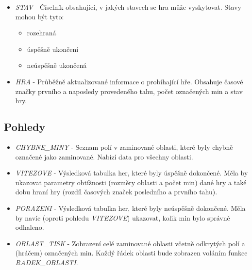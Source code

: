 \documentclass{article}
\begin{document}
{\begin{itemize}
    \item \textit{STAV} - Číselník obsahující, v jakých stavech se hra 
        může vyskytovat. Stavy mohou být tyto: 
        \begin{itemize}
            \item rozehraná
            \item úspěšně ukončení
            \item neúspěšně ukončená
        \end{itemize}
    
    \item \textit{HRA} - Průběžně aktualizované informace o probíhající hře. Obsahuje časové značky
    prvního a naposledy provedeného tahu, počet označených min a stav hry.
\end{itemize}
}
\subsection{Pohledy}
{\renewcommand\labelitemi{}
\begin{itemize}
    \item \textit{CHYBNE\_MINY} - Seznam polí v zaminované oblasti, které byly     chybně označené jako
        zaminované. Nabízí data pro všechny oblasti.
    
    \item \textit{VITEZOVE} - Výsledková tabulka her, které byly úspěšně 
        dokončené. Měla by ukazovat parametry obtížnosti (rozměry oblasti 
        a počet min) dané hry a také dobu hraní hry (rozdíl časových značek 
        posledního a prvního tahu).
    
    \item \textit{PORAZENI} - Výsledková tabulka her, které byly neúspěšně 
        dokončené. Měla by navíc
        (oproti pohledu \textit{VITEZOVE}) ukazovat, 
        kolik min bylo správně odhaleno.
    
    \item \textit{OBLAST\_TISK} - Zobrazení celé zaminované oblasti včetně 
        odkrytých polí a (hráčem) označených min. 
        Každý řádek oblasti bude zobrazen voláním funkce 
        \textit{RADEK\_OBLASTI}.
\end{itemize}
}
\end{document}
